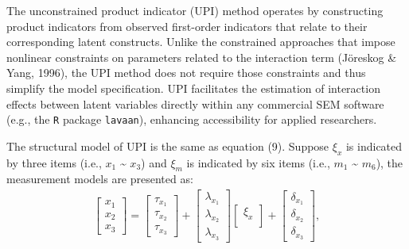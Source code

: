 \documentclass[
  11pt,
  man]{apa6}
\begin{document}
The unconstrained product indicator (UPI) method operates by constructing product indicators from observed first-order indicators that relate to their corresponding latent constructs. Unlike the constrained approaches that impose nonlinear constraints on parameters related to the interaction term (Jöreskog \& Yang, 1996), the UPI method does not require those constraints and thus simplify the model specification. UPI facilitates the estimation of interaction effects between latent variables directly within any commercial SEM software (e.g., the \texttt{R} package \texttt{lavaan}), enhancing accessibility for applied researchers.

The structural model of UPI is the same as equation (9). Suppose \(\xi_{x}\) is indicated by three items (i.e., \(x_{1}\) \textasciitilde{} \(x_{3}\)) and \(\xi_{m}\) is indicated by six items (i.e., \(m_{1}\) \textasciitilde{} \(m_{6}\)), the measurement models are presented as:
\begin{align}
    \begin{bmatrix}
        x_{1} \\
        x_{2} \\ 
        x_{3}
    \end{bmatrix} =
    \begin{bmatrix}
        \tau_{x_{1}} \\
        \tau_{x_{2}} \\ 
        \tau_{x_{3}}
    \end{bmatrix} +
    \begin{bmatrix}
        \lambda_{x_{1}} \\
        \lambda_{x_{2}} \\ 
        \lambda_{x_{3}}
    \end{bmatrix}
    \begin{bmatrix}
        \xi_{x} \\
    \end{bmatrix} +
    \begin{bmatrix}
        \delta_{x_{1}} \\
        \delta_{x_{2}} \\ 
        \delta_{x_{3}}
    \end{bmatrix},
\end{align}
\end{document}
